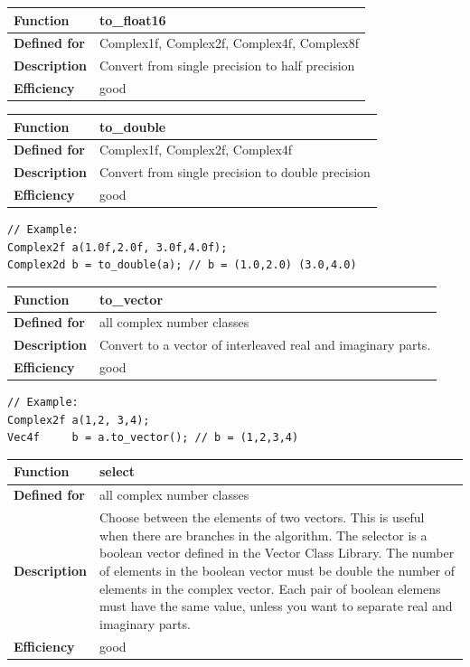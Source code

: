 \documentclass[11pt,a4paper,oneside,openright]{report}
\newcommand{\vspacesmall}{\vspace{3mm}}
\newcommand{\vspacebig}{\vspace{6mm}}
\begin{document}
\begin{tabular}{|p{25mm}|p{100mm}|}
\hline
\bfseries Function & to\_float16 \\ \hline
\bfseries Defined for & Complex1f, Complex2f, Complex4f, Complex8f  \\ \hline
\bfseries Description & Convert from single precision to half precision \\ \hline
\bfseries Efficiency & good \\ \hline
\end{tabular}
\vspacesmall

\begin{tabular}{|p{25mm}|p{100mm}|}
\hline
\bfseries Function & to\_double \\ \hline
\bfseries Defined for & Complex1f, Complex2f, Complex4f  \\ \hline
\bfseries Description & Convert from single precision to double precision \\ \hline
\bfseries Efficiency & good \\ \hline
\end{tabular}
\vspacesmall

\begin{lstlisting}[frame=none]
// Example:
Complex2f a(1.0f,2.0f, 3.0f,4.0f);
Complex2d b = to_double(a); // b = (1.0,2.0) (3.0,4.0)
\end{lstlisting}
\vspacebig


\begin{tabular}{|p{25mm}|p{100mm}|}
\hline
\bfseries Function & to\_vector \\ \hline
\bfseries Defined for & all complex number classes  \\ \hline
\bfseries Description & Convert to a vector of interleaved real and imaginary parts. \\ \hline
\bfseries Efficiency & good \\ \hline
\end{tabular}
\vspacesmall

\begin{lstlisting}[frame=none]
// Example:
Complex2f a(1,2, 3,4);
Vec4f     b = a.to_vector(); // b = (1,2,3,4)
\end{lstlisting}
\vspacebig


\begin{tabular}{|p{25mm}|p{100mm}|}
\hline
\bfseries Function & select \\ \hline
\bfseries Defined for & all complex number classes \\ \hline
\bfseries Description & Choose between the elements of two vectors.
This is useful when there are branches in the algorithm.\newline
The selector is a boolean vector defined in the Vector Class Library.
The number of elements in the boolean vector must be double the number of elements in the complex vector. Each pair of boolean elemens must have the same value, unless you want to separate real and imaginary parts. \\ \hline
\bfseries Efficiency & good \\ \hline
\end{tabular}
\vspacesmall
\end{document}
